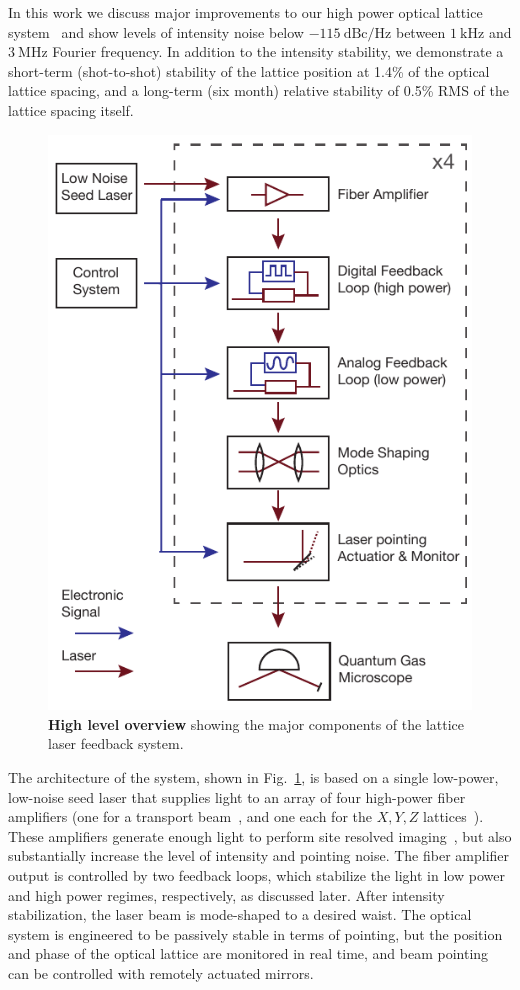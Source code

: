 \documentclass[twocolumn,aps,pra,showpacs,preprintnumbers,bibnotes]{revtex4-1}
\newcommand\unit[2]{\ensuremath{#1~\mathrm{{#2}}}}
\begin{document}
In this work we discuss major improvements to our high power optical lattice system~\cite{Blatt2015} and show levels of intensity noise below \unit{-115}{dBc/Hz} between \unit{1}{kHz} and \unit{3}{MHz} Fourier frequency.
In addition to the intensity stability, we demonstrate a short-term (shot-to-shot) stability of the lattice position at 1.4\% of the optical lattice spacing, and a long-term (six month) relative stability of 0.5\% RMS of the lattice spacing itself.

\begin{figure}[t]
  \begin{center}
    \includegraphics[width=0.8\columnwidth]{Figure1.pdf}
    \caption{\textbf{High level overview} showing the major components of the lattice laser feedback system.}\label{fig:high_level}
  \end{center}
\end{figure}

The architecture of the system, shown in Fig.~\ref{fig:high_level}, is based on a single low-power, low-noise seed laser that supplies light to an array of four high-power fiber amplifiers (one for a transport beam~\cite{Huber2014}, and one each for the $X,Y,Z$ lattices~\cite{Blatt2015,Parsons2016}).
These amplifiers generate enough light to perform site resolved imaging~\cite{Parsons2015}, but also substantially increase the level of intensity and pointing noise.
The fiber amplifier output is controlled by two feedback loops, which stabilize the light in low power and high power regimes, respectively, as discussed later.
After intensity stabilization, the laser beam is mode-shaped to a desired waist.
The optical system is engineered to be passively stable in terms of pointing, but the position and phase of the optical lattice are monitored in real time, and beam pointing can be controlled with remotely actuated mirrors.
\end{document}

